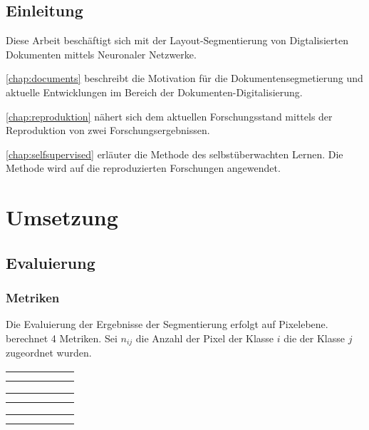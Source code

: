 

\section*{Einleitung}
Diese Arbeit beschäftigt sich mit der Layout-Segmentierung von Digtalisierten Dokumenten mittels Neuronaler Netzwerke.

\cref{chap:documents} beschreibt die Motivation für die Dokumentensegmetierung und aktuelle Entwicklungen im
Bereich der Dokumenten-Digitalisierung.

\cref{chap:reproduktion} nähert sich dem aktuellen Forschungsstand mittels der Reproduktion von zwei Forschungsergebnissen.

\cref{chap:selfsupervised} erläuter die Methode des selbstüberwachten Lernen. Die Methode wird auf die reproduzierten Forschungen angewendet.




\chapter{Umsetzung}

\section{Evaluierung}


\subsection{Metriken}
Die Evaluierung der Ergebnisse der Segmentierung erfolgt auf Pixelebene.
\cite{LongFullyconvolutionalnetworks2015} berechnet 4 Metriken.
Sei \(n_{ij}\) die Anzahl der Pixel der Klasse \(i\) die der Klasse \(j\) zugeordnet wurden.


\newcommand{\resulttable}[3]{
    \begin{tabular}{l|r|r|r|r|r}%
    \hline
        \csvreader[head to column names, filter equal={\dataset}{#2}]{#1}{}%
        {#3}
        \end{tabular}
}
\begin{table*}
    \resulttable{results/document_image_segmentation_results.csv}{CB55}{ \name & \pixelacc & \FgPA & \meanacc & \meanIU & \fwIU\\}
    \resulttable{results/document_image_segmentation_results.csv}{CSG18}{  \pixelacc & \FgPA & \meanacc & \meanIU & \fwIU\\}
    \resulttable{results/document_image_segmentation_results.csv}{CSG863}{  \pixelacc & \FgPA & \meanacc & \meanIU & \fwIU\\}
        
\end{table*}

